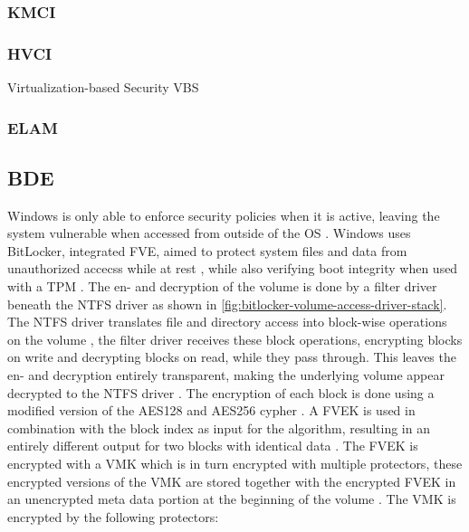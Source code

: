 \cite{microsoft-trusted-boot}
\cite{microsoft-secure-the-windows-boot-process}
\cite{understanding-windows-trusted-boot}
\subsubsection{KMCI}
\subsubsection{HVCI}
Virtualization-based Security {VBS}

\subsubsection{ELAM}

\subsection{\acf{BDE}}
\label{sec:windows:bde}
Windows is only able to enforce security policies when it is active, leaving the system vulnerable when accessed from outside of the \ac{OS} \cite[9. BitLocker Drive encryption]{windows-internals-6-part2}.
Windows uses BitLocker, integrated \ac{FVE}, aimed to protect system files and data from unauthorized accecss while at rest \cite{microsoft-bitlocker-overview}, while also verifying boot integrity when used with a \ac{TPM} \cite[9. BitLocker Drive encryption]{windows-internals-6-part2}.
The en- and decryption of the volume is done by a filter driver beneath the \ac{NTFS} driver as shown in \autoref{fig:bitlocker-volume-access-driver-stack}.
The \ac{NTFS} driver translates file and directory access into block-wise operations on the volume , the filter driver receives these block operations, encrypting blocks on write and decrypting blocks on read, while they pass through.
This leaves the en- and decryption entirely transparent, making the underlying volume appear decrypted to the \ac{NTFS} driver \cite[9. Full-Volume Encryption Driver]{windows-internals-6-part2}.
The encryption of each block is done using a modified version of the \ac{AES}128 and \ac{AES}256 cypher \cite[9. Encryption Keys]{windows-internals-6-part2}.
A \ac{FVEK} is used in combination with the block index as input for the algorithm, resulting in an entirely different output for two blocks with identical data \cite[9. Full-Volume Encryption Driver]{windows-internals-6-part2}.
The \ac{FVEK} is encrypted with a \ac{VMK} which is in turn encrypted with multiple protectors, these encrypted versions of the \ac{VMK} are stored together with the encrypted \ac{FVEK} in an unencrypted meta data portion at the beginning of the volume \cite[9. Encryption Keys]{windows-internals-6-part2}.
The \ac{VMK} is encrypted by the following protectors:

